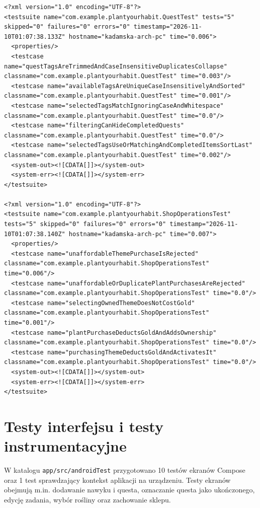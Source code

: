 \documentclass[a4paper,12pt]{article}
\begin{document}
\begin{verbatim}
<?xml version="1.0" encoding="UTF-8"?>
<testsuite name="com.example.plantyourhabit.QuestTest" tests="5" skipped="0" failures="0" errors="0" timestamp="2026-11-10T01:07:38.133Z" hostname="kadamska-arch-pc" time="0.006">
  <properties/>
  <testcase name="questTagsAreTrimmedAndCaseInsensitiveDuplicatesCollapse" classname="com.example.plantyourhabit.QuestTest" time="0.003"/>
  <testcase name="availableTagsAreUniqueCaseInsensitivelyAndSorted" classname="com.example.plantyourhabit.QuestTest" time="0.001"/>
  <testcase name="selectedTagsMatchIgnoringCaseAndWhitespace" classname="com.example.plantyourhabit.QuestTest" time="0.0"/>
  <testcase name="filteringCanHideCompletedQuests" classname="com.example.plantyourhabit.QuestTest" time="0.0"/>
  <testcase name="selectedTagsUseOrMatchingAndCompletedItemsSortLast" classname="com.example.plantyourhabit.QuestTest" time="0.002"/>
  <system-out><![CDATA[]]></system-out>
  <system-err><![CDATA[]]></system-err>
</testsuite>

<?xml version="1.0" encoding="UTF-8"?>
<testsuite name="com.example.plantyourhabit.ShopOperationsTest" tests="5" skipped="0" failures="0" errors="0" timestamp="2026-11-10T01:07:38.140Z" hostname="kadamska-arch-pc" time="0.007">
  <properties/>
  <testcase name="unaffordableThemePurchaseIsRejected" classname="com.example.plantyourhabit.ShopOperationsTest" time="0.006"/>
  <testcase name="unaffordableOrDuplicatePlantPurchasesAreRejected" classname="com.example.plantyourhabit.ShopOperationsTest" time="0.0"/>
  <testcase name="selectingOwnedThemeDoesNotCostGold" classname="com.example.plantyourhabit.ShopOperationsTest" time="0.001"/>
  <testcase name="plantPurchaseDeductsGoldAndAddsOwnership" classname="com.example.plantyourhabit.ShopOperationsTest" time="0.0"/>
  <testcase name="purchasingThemeDeductsGoldAndActivatesIt" classname="com.example.plantyourhabit.ShopOperationsTest" time="0.0"/>
  <system-out><![CDATA[]]></system-out>
  <system-err><![CDATA[]]></system-err>
</testsuite>
\end{verbatim}

\section{Testy interfejsu i testy instrumentacyjne}
W katalogu \texttt{app/src/androidTest} przygotowano 10 testów ekranów Compose oraz 1 test sprawdzający kontekst aplikacji na urządzeniu. Testy ekranów obejmują m.in. dodawanie nawyku i questa, oznaczanie questa jako ukończonego, edycję zadania, wybór rośliny oraz zachowanie sklepu.
\end{document}
